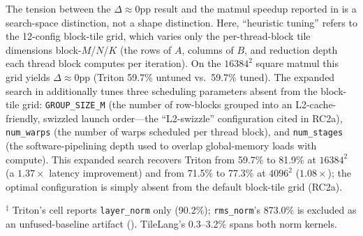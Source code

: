 The tension between the $\Delta \approx 0$pp result and the matmul speedup reported in  is a search-space distinction, not a shape distinction.
Here, ``heuristic tuning'' refers to the 12-config block-tile grid, which varies only the per-thread-block tile dimensions block-$M$/$N$/$K$ (the rows of $A$, columns of $B$, and reduction depth each thread block computes per iteration).
On the $16384^2$ square matmul this grid yields $\Delta \approx 0$pp (Triton 59.7\% untuned vs.\ 59.7\% tuned).
The expanded search in  additionally tunes three scheduling parameters absent from the block-tile grid: \texttt{GROUP\_SIZE\_M} (the number of row-blocks grouped into an L2-cache-friendly, swizzled launch order---the ``L2-swizzle'' configuration cited in RC2a), \texttt{num\_warps} (the number of warps scheduled per thread block), and \texttt{num\_stages} (the software-pipelining depth used to overlap global-memory loads with compute).
This expanded search recovers Triton from 59.7\% to 81.9\% at $16384^2$ (a $1.37\times$ latency improvement) and from 71.5\% to 77.3\% at $4096^2$ ($1.08\times$);
the optimal configuration is simply absent from the default block-tile grid (RC2a).

\label{sec:eval:summary}


\begin{table}[t]
  \centering
  \caption{Median library efficiency (\%) per kernel category and DSL on the A100-SXM4 and GH200
    (both unlocked tuned profile), computed over large-size benchmark configurations.
    Attention excluded from Overall ().}
  \label{tab:summary}
  {\footnotesize
    $^\ddagger$ Triton's cell reports \texttt{layer\_norm} only (90.2\%); \texttt{rms\_norm}'s 873.0\% is excluded as an unfused-baseline artifact (). TileLang's 0.3--3.2\% spans both norm kernels.}
\end{table}

